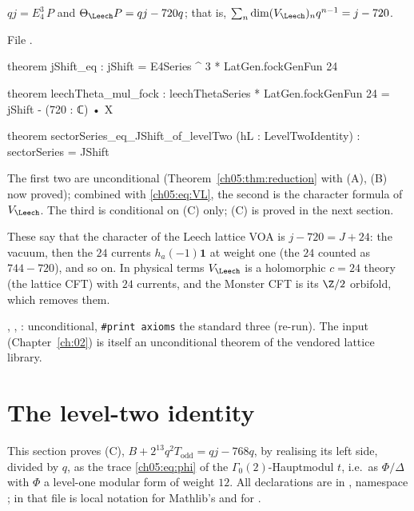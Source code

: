\begin{corollary}\label{ch05:cor:jVL}
$qj = E_4^3\,P$ and $\Theta_\Leech P = qj - 720q$; that is, $\sum_n\dim(V_\Leech)_nq^{n-1} = j - 720$.
\end{corollary}
\noindent File .
\begin{leancode}
theorem jShift_eq : jShift = E4Series ^ 3 * LatGen.fockGenFun 24

theorem leechTheta_mul_fock :
    leechThetaSeries * LatGen.fockGenFun 24 = jShift - (720 : ℂ) • X

theorem sectorSeries_eq_JShift_of_levelTwo (hL : LevelTwoIdentity) : sectorSeries = JShift
\end{leancode}
\begin{dictionary}
The first two are unconditional (Theorem~\ref{ch05:thm:reduction} with (A), (B) now proved); combined
with \eqref{ch05:eq:VL}, the second is the character formula of $V_\Leech$. The third is conditional on
(C) only; (C) is proved in the next section.
\end{dictionary}

\begin{physics}
These say that the character of the Leech lattice VOA is $j-720=J+24$: the vacuum, then the $24$ currents $h_a(-1)\mathbf 1$ at weight one (the $24$ counted as $744-720$), and so on. In physical terms $V_\Leech$ is a holomorphic $c=24$ theory (the lattice CFT) with $24$ currents, and the Monster CFT is its $\Z/2$ orbifold, which removes them.
\end{physics}

\begin{status}
, , : unconditional,
\texttt{\#print axioms} the standard three (re-run). The input
 (Chapter~\ref{ch:02}) is itself an unconditional theorem of the
vendored lattice library.
\end{status}

\section{The level-two identity}\label{ch05:sec:leveltwo}

This section proves (C), $B + 2^{13}q^2T_{\mathrm{odd}} = qj - 768q$, by realising its left side, divided
by $q$, as the trace \eqref{ch05:eq:phi} of the $\Gamma_0(2)$-Hauptmodul $t$, i.e.\ as $\Phi/\Delta$ with
$\Phi$ a level-one modular form of weight $12$. All declarations are in
, namespace ; in that file
 is local notation for Mathlib's  and  for
.

